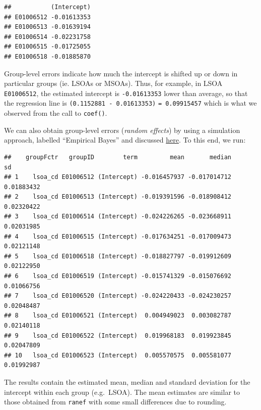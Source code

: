 \documentclass[
]{book}
\newenvironment{Shaded}{\begin{snugshade}}{\end{snugshade}}
\newcommand{\CommentTok}[1]{\textcolor[rgb]{0.56,0.35,0.01}{\textit{#1}}}
\newcommand{\DecValTok}[1]{\textcolor[rgb]{0.00,0.00,0.81}{#1}}
\newcommand{\KeywordTok}[1]{\textcolor[rgb]{0.13,0.29,0.53}{\textbf{#1}}}
\newcommand{\NormalTok}[1]{#1}
\newcommand{\OperatorTok}[1]{\textcolor[rgb]{0.81,0.36,0.00}{\textbf{#1}}}
\newcommand{\StringTok}[1]{\textcolor[rgb]{0.31,0.60,0.02}{#1}}
\begin{document}
\begin{verbatim}
##           (Intercept)
## E01006512 -0.01613353
## E01006513 -0.01639194
## E01006514 -0.02231758
## E01006515 -0.01725055
## E01006518 -0.01885870
\end{verbatim}

Group-level errors indicate how much the intercept is shifted up or down in particular groups (ie. LSOAs or MSOAs). Thus, for example, in LSOA \texttt{E01006512}, the estimated intercept is \texttt{-0.01613353} lower than average, so that the regression line is \texttt{(0.1152881\ -\ 0.01613353)} \texttt{=\ 0.09915457} which is what we observed from the call to \texttt{coef()}.

We can also obtain group-level errors (\emph{random effects}) by using a simulation approach, labelled ``Empirical Bayes'' and discussed \href{https://stat.ethz.ch/pipermail/r-sig-mixed-models/2009q4/002984.html}{here}. To this end, we run:

\begin{Shaded}
\end{Shaded}

\begin{verbatim}
##    groupFctr   groupID        term         mean       median         sd
## 1    lsoa_cd E01006512 (Intercept) -0.016457937 -0.017014712 0.01883432
## 2    lsoa_cd E01006513 (Intercept) -0.019391596 -0.018908412 0.02320422
## 3    lsoa_cd E01006514 (Intercept) -0.024226265 -0.023668911 0.02031985
## 4    lsoa_cd E01006515 (Intercept) -0.017634251 -0.017009473 0.02121148
## 5    lsoa_cd E01006518 (Intercept) -0.018827797 -0.019912609 0.02122950
## 6    lsoa_cd E01006519 (Intercept) -0.015741329 -0.015076692 0.01066756
## 7    lsoa_cd E01006520 (Intercept) -0.024220433 -0.024230257 0.02048487
## 8    lsoa_cd E01006521 (Intercept)  0.004949023  0.003082787 0.02140118
## 9    lsoa_cd E01006522 (Intercept)  0.019968183  0.019923845 0.02047809
## 10   lsoa_cd E01006523 (Intercept)  0.005570575  0.005581077 0.01992987
\end{verbatim}

The results contain the estimated mean, median and standard deviation for the intercept within each group (e.g.~LSOA). The mean estimates are similar to those obtained from \texttt{ranef} with some small differences due to rounding.
\end{document}
